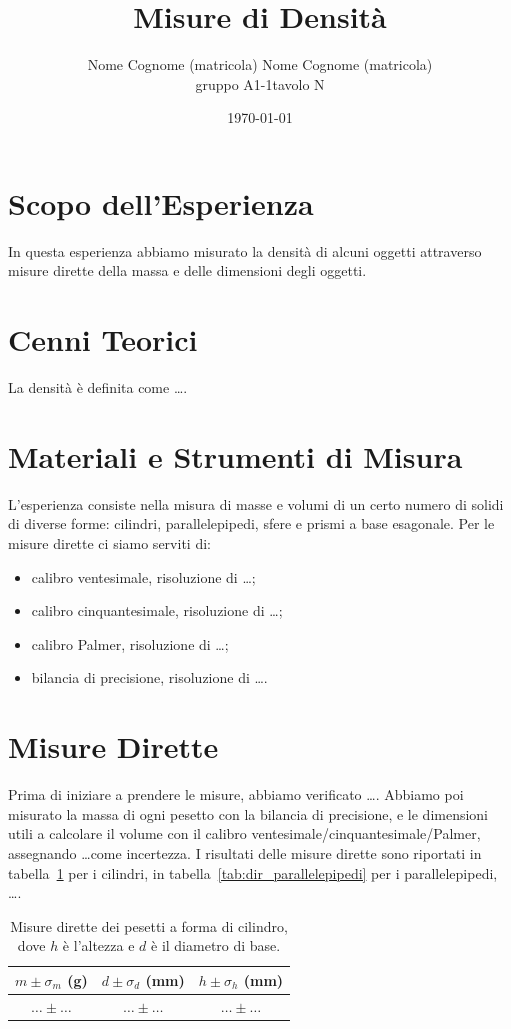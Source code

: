 \documentclass[a4paper]{article}
\title{Misure di Densit\`a}
\author{Nome Cognome (matricola)\quad
        \vspace{3mm}
        Nome Cognome (matricola)\\
         gruppo A1-1\quad tavolo N}
\date{\today}
\begin{document}
\maketitle
\section{Scopo dell'Esperienza}
In questa esperienza abbiamo misurato la densit\`a di alcuni oggetti attraverso misure dirette della massa e delle dimensioni degli oggetti.

\section{Cenni Teorici}
La densit\`a \`e definita come \ldots.

\section{Materiali e Strumenti di Misura}
L'esperienza consiste nella misura di masse e volumi di un certo numero di solidi di diverse forme: cilindri, parallelepipedi, sfere e prismi a base esagonale. Per le misure dirette ci siamo serviti di:
\begin{itemize}
    \item calibro ventesimale, risoluzione di \ldots;
    \item calibro cinquantesimale, risoluzione di \ldots;
    \item calibro Palmer, risoluzione di \ldots;
    \item bilancia di precisione, risoluzione di \ldots.
\end{itemize}

\section{Misure Dirette}

Prima di iniziare a prendere le misure, abbiamo verificato \ldots.
Abbiamo poi misurato la massa di ogni pesetto con la bilancia di precisione, 
e le dimensioni utili a calcolare il volume con il calibro ventesimale/cinquantesimale/Palmer, assegnando \ldots come incertezza. I risultati delle misure dirette sono riportati in tabella~\ref{tab:dir_cilindri} per i cilindri, in tabella~\ref{tab:dir_parallelepipedi} per i parallelepipedi, \ldots.

\begin{table}[]
    \centering
    \begin{tabular}{c|c|c}
      $m\pm \sigma_m$ (g)   & $d\pm\sigma_d$ (mm)  & $h\pm\sigma_h$ (mm)\\
      \hline
     $\ldots \pm \ldots$    & $\ldots \pm \ldots$ &$\ldots \pm \ldots$\\
    \end{tabular}
    \caption{Misure dirette dei pesetti a forma di cilindro, dove $h$ \`e l'altezza e $d$ \`e il diametro di base.}
    \label{tab:dir_cilindri}
\end{table}
\end{document}
